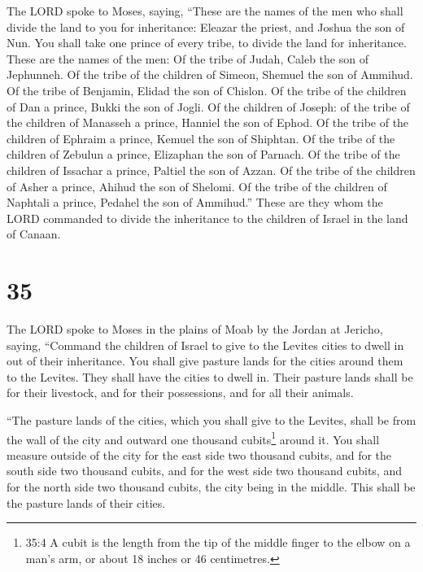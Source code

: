  The LORD spoke to Moses, saying,  ``These are
the names of the men who shall divide the land to you for inheritance:
Eleazar the priest, and Joshua the son of Nun.  You shall
take one prince of every tribe, to divide the land for inheritance.
 These are the names of the men: Of the tribe of Judah,
Caleb the son of Jephunneh.  Of the tribe of the children
of Simeon, Shemuel the son of Ammihud.  Of the tribe of
Benjamin, Elidad the son of Chislon.  Of the tribe of the
children of Dan a prince, Bukki the son of Jogli.  Of the
children of Joseph: of the tribe of the children of Manasseh a prince,
Hanniel the son of Ephod.  Of the tribe of the children of
Ephraim a prince, Kemuel the son of Shiphtan.  Of the tribe
of the children of Zebulun a prince, Elizaphan the son of Parnach.
 Of the tribe of the children of Issachar a prince, Paltiel
the son of Azzan.  Of the tribe of the children of Asher a
prince, Ahihud the son of Shelomi.  Of the tribe of the
children of Naphtali a prince, Pedahel the son of Ammihud.''
 These are they whom the LORD commanded to divide the
inheritance to the children of Israel in the land of Canaan.

\hypertarget{section-34}{%
\section{35}\label{section-34}}

 The LORD spoke to Moses in the plains of Moab by the Jordan
at Jericho, saying,  ``Command the children of Israel to
give to the Levites cities to dwell in out of their inheritance. You
shall give pasture lands for the cities around them to the Levites.
 They shall have the cities to dwell in. Their pasture lands
shall be for their livestock, and for their possessions, and for all
their animals.

 ``The pasture lands of the cities, which you shall give to
the Levites, shall be from the wall of the city and outward one thousand
cubits\footnote{35:4 A cubit is the length from the tip of the middle
  finger to the elbow on a man's arm, or about 18 inches or 46
  centimetres.} around it.  You shall measure outside of the
city for the east side two thousand cubits, and for the south side two
thousand cubits, and for the west side two thousand cubits, and for the
north side two thousand cubits, the city being in the middle. This shall
be the pasture lands of their cities.


